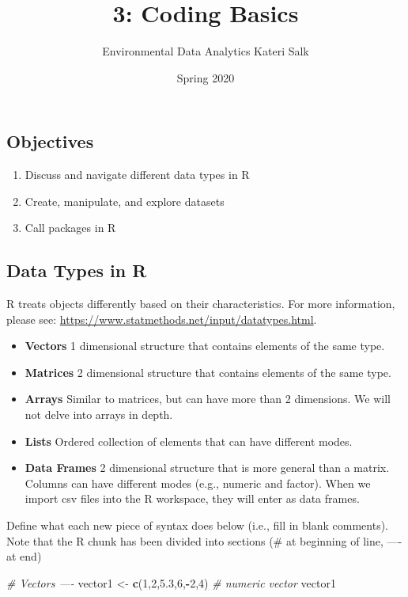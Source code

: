 \documentclass[]{article}
\title{3: Coding Basics}
\author{Environmental Data Analytics \textbar{} Kateri Salk}
\date{Spring 2020}
\newenvironment{Shaded}{\begin{snugshade}}{\end{snugshade}}
\newcommand{\KeywordTok}[1]{\textcolor[rgb]{0.13,0.29,0.53}{\textbf{#1}}}
\newcommand{\DecValTok}[1]{\textcolor[rgb]{0.00,0.00,0.81}{#1}}
\newcommand{\FloatTok}[1]{\textcolor[rgb]{0.00,0.00,0.81}{#1}}
\newcommand{\StringTok}[1]{\textcolor[rgb]{0.31,0.60,0.02}{#1}}
\newcommand{\CommentTok}[1]{\textcolor[rgb]{0.56,0.35,0.01}{\textit{#1}}}
\newcommand{\OperatorTok}[1]{\textcolor[rgb]{0.81,0.36,0.00}{\textbf{#1}}}
\newcommand{\NormalTok}[1]{#1}
\providecommand{\tightlist}{%
  \setlength{\itemsep}{0pt}\setlength{\parskip}{0pt}}
\begin{document}
\maketitle

\subsection{Objectives}\label{objectives}

\begin{enumerate}
\def\labelenumi{\arabic{enumi}.}
\tightlist
\item
  Discuss and navigate different data types in R
\item
  Create, manipulate, and explore datasets
\item
  Call packages in R
\end{enumerate}

\subsection{Data Types in R}\label{data-types-in-r}

R treats objects differently based on their characteristics. For more
information, please see:
\url{https://www.statmethods.net/input/datatypes.html}.

\begin{itemize}
\item
  \textbf{Vectors} 1 dimensional structure that contains elements of the
  same type.
\item
  \textbf{Matrices} 2 dimensional structure that contains elements of
  the same type.
\item
  \textbf{Arrays} Similar to matrices, but can have more than 2
  dimensions. We will not delve into arrays in depth.
\item
  \textbf{Lists} Ordered collection of elements that can have different
  modes.
\item
  \textbf{Data Frames} 2 dimensional structure that is more general than
  a matrix. Columns can have different modes (e.g., numeric and factor).
  When we import csv files into the R workspace, they will enter as data
  frames.
\end{itemize}

Define what each new piece of syntax does below (i.e., fill in blank
comments). Note that the R chunk has been divided into sections (\# at
beginning of line, ---- at end)

\begin{Shaded}
\begin{Highlighting}[]
\CommentTok{# Vectors ----}
\NormalTok{vector1 <-}\StringTok{ }\KeywordTok{c}\NormalTok{(}\DecValTok{1}\NormalTok{,}\DecValTok{2}\NormalTok{,}\FloatTok{5.3}\NormalTok{,}\DecValTok{6}\NormalTok{,}\OperatorTok{-}\DecValTok{2}\NormalTok{,}\DecValTok{4}\NormalTok{) }\CommentTok{# numeric vector}
\NormalTok{vector1}
\end{Highlighting}
\end{Shaded}
\end{document}
